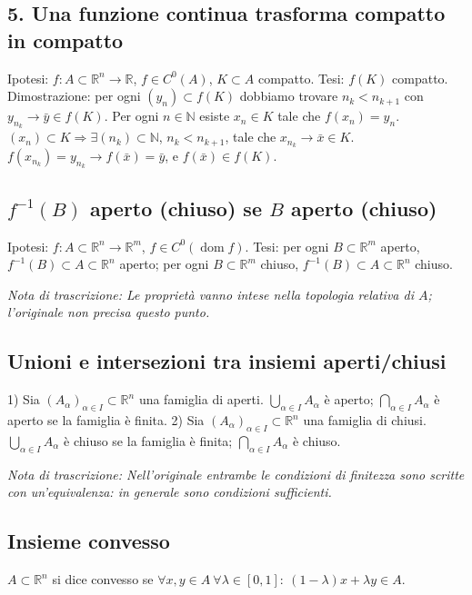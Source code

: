 \documentclass[11pt,a4paper]{article}
\newcommand{\R}{\mathbb R}\newcommand{\N}{\mathbb N}\newcommand{\pagina}[1]{\clearpage}
\newcommand{\nota}[1]{\par\textit{Nota di trascrizione: #1}\par}
\begin{document}
\subsection*{5. Una funzione continua trasforma compatto in compatto}
Ipotesi: $f:A\subset\R^n\to\R$, $f\in C^0(A)$, $K\subset A$ compatto. Tesi: $f(K)$ compatto.
Dimostrazione: per ogni $(y_n)\subset f(K)$ dobbiamo trovare $n_k<n_{k+1}$ con $y_{n_k}\to\bar y\in f(K)$.
Per ogni $n\in\N$ esiste $x_n\in K$ tale che $f(x_n)=y_n$.
$(x_n)\subset K\Rightarrow\exists(n_k)\subset\N$, $n_k<n_{k+1}$, tale che $x_{n_k}\to\bar x\in K$.
$f(x_{n_k})=y_{n_k}\to f(\bar x)=\bar y$, e $f(\bar x)\in f(K)$.
\pagina{18}
\subsection*{$f^{-1}(B)$ aperto (chiuso) se $B$ aperto (chiuso)}
Ipotesi: $f:A\subset\R^n\to\R^m$, $f\in C^0(\operatorname{dom}f)$.
Tesi: per ogni $B\subset\R^m$ aperto, $f^{-1}(B)\subset A\subset\R^n$ aperto; per ogni $B\subset\R^m$ chiuso, $f^{-1}(B)\subset A\subset\R^n$ chiuso.
\nota{Le proprietà vanno intese nella topologia relativa di $A$; l'originale non precisa questo punto.}
\subsection*{Unioni e intersezioni tra insiemi aperti/chiusi}
1) Sia $(A_\alpha)_{\alpha\in I}\subset\R^n$ una famiglia di aperti. $\bigcup_{\alpha\in I}A_\alpha$ è aperto; $\bigcap_{\alpha\in I}A_\alpha$ è aperto se la famiglia è finita.
2) Sia $(A_\alpha)_{\alpha\in I}\subset\R^n$ una famiglia di chiusi. $\bigcup_{\alpha\in I}A_\alpha$ è chiuso se la famiglia è finita; $\bigcap_{\alpha\in I}A_\alpha$ è chiuso.
\nota{Nell'originale entrambe le condizioni di finitezza sono scritte con un'equivalenza: in generale sono condizioni sufficienti.}
\subsection*{Insieme convesso}
$A\subset\R^n$ si dice convesso se $\forall x,y\in A\ \forall\lambda\in[0,1]:\ (1-\lambda)x+\lambda y\in A$.
\begin{center}\end{center}
\end{document}
